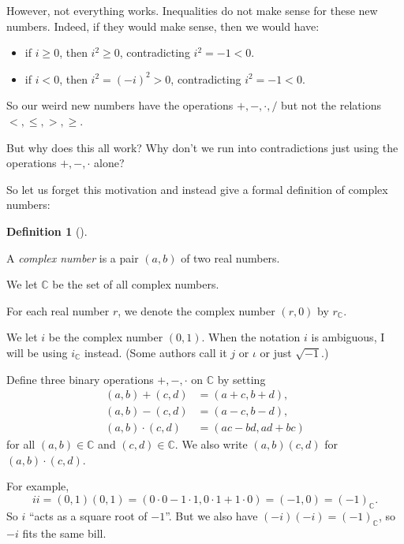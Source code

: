 \documentclass[numbers=enddot,12pt,final,onecolumn,notitlepage]{scrartcl}%
\numberwithin{exer}{subsection}
\theoremstyle{definition}
\newtheorem{defi}[theo]{Definition}
\newenvironment{definition}[1][]
{\begin{defi}[#1]\begin{leftbar}}
{\end{leftbar}\end{defi}}
\begin{document}
However, not everything works. Inequalities do not make sense for these new
numbers. Indeed, if they would make sense, then we would have:

\begin{itemize}
\item if $i\geq0$, then $i^{2}\geq0$, contradicting $i^{2}=-1<0$.

\item if $i<0$, then $i^{2}=\left(  -i\right)  ^{2}>0$, contradicting
$i^{2}=-1<0$.
\end{itemize}

So our weird new numbers have the operations $+,-,\cdot,/$ but not the
relations $<,\leq,>,\geq$.

But why does this all work? Why don't we run into contradictions just using
the operations $+,-,\cdot$ alone?

So let us forget this motivation and instead give a formal definition of
complex numbers:

\begin{definition}
\label{def.CC.CC}A \textit{complex number} is a pair $\left(  a,b\right)  $ of
two real numbers.

We let $\mathbb{C}$ be the set of all complex numbers.

For each real number $r$, we denote the complex number $\left(  r,0\right)  $
by $r_{\mathbb{C}}$.

We let $i$ be the complex number $\left(  0,1\right)  $. When the notation $i$
is ambiguous, I will be using $i_{\mathbb{C}}$ instead. (Some authors call it
$j$ or $\iota$ or just $\sqrt{-1}$.)

Define three binary operations $+,-,\cdot$ on $\mathbb{C}$ by setting%
\begin{align*}
\left(  a,b\right)  +\left(  c,d\right)   &  =\left(  a+c,b+d\right)  ,\\
\left(  a,b\right)  -\left(  c,d\right)   &  =\left(  a-c,b-d\right)  ,\\
\left(  a,b\right)  \cdot\left(  c,d\right)   &  =\left(  ac-bd,ad+bc\right)
\end{align*}
for all $\left(  a,b\right)  \in\mathbb{C}$ and $\left(  c,d\right)
\in\mathbb{C}$. We also write $\left(  a,b\right)  \left(  c,d\right)  $ for
$\left(  a,b\right)  \cdot\left(  c,d\right)  $.
\end{definition}

For example,%
\[
ii=\left(  0,1\right)  \left(  0,1\right)  =\left(  0\cdot0-1\cdot
1,0\cdot1+1\cdot0\right)  =\left(  -1,0\right)  =\left(  -1\right)
_{\mathbb{C}}.
\]
So $i$ \textquotedblleft acts as a square root of $-1$\textquotedblright. But
we also have $\left(  -i\right)  \left(  -i\right)  =\left(  -1\right)
_{\mathbb{C}}$, so $-i$ fits the same bill.
\end{document}
